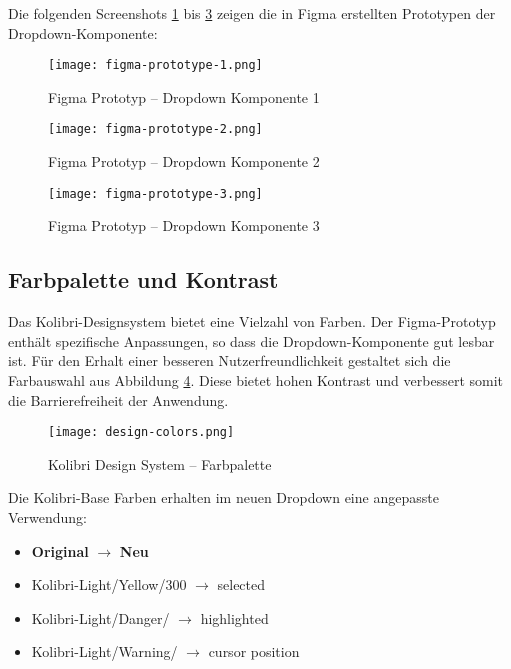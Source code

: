 Die folgenden Screenshots \ref{img:figmaPrototype1} bis \ref{img:figmaPrototype3} zeigen die in Figma erstellten Prototypen der Dropdown-Komponente:

\begin{figure}[!htb]
    \centering
    \texttt{[image: figma-prototype-1.png]}
    \caption{\centering Figma Prototyp – Dropdown Komponente 1}
    \label{img:figmaPrototype1}
\end{figure}

\begin{figure}[!htb]
    \centering
    \texttt{[image: figma-prototype-2.png]}
    \caption{\centering Figma Prototyp – Dropdown Komponente 2}
    \label{img:figmaPrototype2}
\end{figure}

\begin{figure}[!htb]
    \centering
    \texttt{[image: figma-prototype-3.png]}
    \caption{\centering Figma Prototyp – Dropdown Komponente 3}
    \label{img:figmaPrototype3}
\end{figure}


\subsection{Farbpalette und Kontrast}
\label{sec:colorContrast}

Das Kolibri-Designsystem bietet eine Vielzahl von Farben. 
Der Figma-Prototyp enthält spezifische Anpassungen, so dass die Dropdown-Komponente gut lesbar ist. 
Für den Erhalt einer besseren Nutzerfreundlichkeit gestaltet sich die Farbauswahl aus Abbildung \ref{img:designColors}. 
Diese bietet hohen Kontrast und verbessert somit die Barrierefreiheit der Anwendung. 

\begin{figure}[!htb]
    \centering
    \texttt{[image: design-colors.png]}
    \caption{\centering Kolibri Design System – Farbpalette}
    \label{img:designColors}
\end{figure}

\noindent
Die Kolibri-Base Farben erhalten im neuen Dropdown eine angepasste Verwendung:

\begin{itemize}
    \item \textbf{Original} $\rightarrow$ \textbf{Neu}
    \item Kolibri-Light/Yellow/300 $\rightarrow$ selected
    \item Kolibri-Light/Danger/ $\rightarrow$ highlighted
    \item Kolibri-Light/Warning/ $\rightarrow$ cursor position
\end{itemize}

